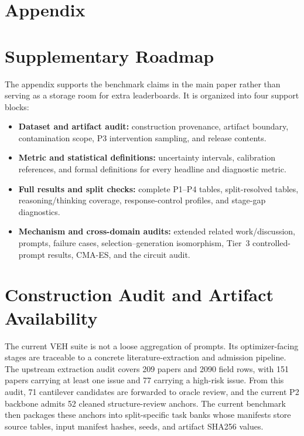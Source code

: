 \newpage

\section*{\hspace{-4mm} \centering Appendix}
\vspace{3mm}

\section{Supplementary Roadmap}

The appendix supports the benchmark claims in the main paper rather than serving as a storage room for extra leaderboards. It is organized into four support blocks:
\begin{itemize}[leftmargin=5mm,itemsep=1mm,topsep=1mm]
    \item \textbf{Dataset and artifact audit:} construction provenance, artifact boundary, contamination scope, P3 intervention sampling, and release contents.
    \item \textbf{Metric and statistical definitions:} uncertainty intervals, calibration references, and formal definitions for every headline and diagnostic metric.
    \item \textbf{Full results and split checks:} complete P1--P4 tables, split-resolved tables, reasoning/thinking coverage, response-control profiles, and stage-gap diagnostics.
    \item \textbf{Mechanism and cross-domain audits:} extended related work/discussion, prompts, failure cases, selection--generation isomorphism, Tier~3 controlled-prompt results, CMA-ES, and the circuit audit.
\end{itemize}

\section{Construction Audit and Artifact Availability}

The current VEH suite is not a loose aggregation of prompts. Its optimizer-facing stages are traceable to a concrete literature-extraction and admission pipeline. The upstream extraction audit covers 209 papers and 2090 field rows, with 151 papers carrying at least one issue and 77 carrying a high-risk issue. From this audit, 71 cantilever candidates are forwarded to oracle review, and the current P2 backbone admits 52 cleaned structure-review anchors. The current benchmark then packages these anchors into split-specific task banks whose manifests store source tables, input manifest hashes, seeds, and artifact SHA256 values.

